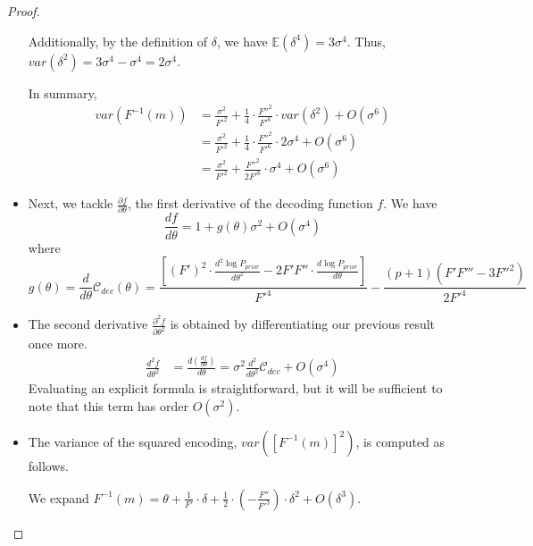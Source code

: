 \begin{proof}
\begin{itemize}
Additionally, by the definition of $\delta$, we have $\mathbb{E}(\delta^4) = 3\sigma^4$.
Thus, $var(\delta^2) = 3\sigma^4 - \sigma^4 = 2\sigma^4$.

In summary,
\begin{align*}
    var(F^{-1}(m)) &= \frac{\sigma^2}{F'^2} + \frac{1}{4} \cdot \frac{F''^2}{F'^6} \cdot var(\delta^2) + O(\sigma^6)\\
    &= \frac{\sigma^2}{F'^2} + \frac{1}{4} \cdot \frac{F''^2}{F'^6} \cdot 2\sigma^4 + O(\sigma^6)\\
    &= \frac{\sigma^2}{F'^2} + \frac{F''^2}{2F'^6} \cdot \sigma^4 + O(\sigma^6)
\end{align*}

    \item Next, we tackle {$\frac{\partial f}{\partial \theta}$}, the first derivative of the decoding function $f$.
We have
\begin{equation}
    \frac{df}{d\theta} = 1 + g(\theta) \sigma^2 + O(\sigma^4)
\end{equation}
where
\begin{equation}\label{eq:derivation-of-g}
    g(\theta) = \frac{d}{d\theta} \mathcal{C}_{dec}(\theta) = \frac{[(F')^2 \cdot \frac{d^2 \log P_{prior}}{d \theta^2} - 2F'F'' \cdot \frac{d \log P_{prior}}{d \theta}]}{F'^4} - \frac{(p+1)(F'F''' - 3F''^2)}{2F'^4}
\end{equation}

    

    \item The second derivative {$\frac{\partial^2 f}{\partial \theta^2}$} is obtained by differentiating our previous result once more.
    \begin{align*}
        \frac{d^2f}{d\theta^2} &= \frac{d (\frac{df}{d\theta})}{d\theta} = \sigma^2 \frac{d^2}{d\theta^2} \mathcal{C}_{dec} + O(\sigma^4)
    \end{align*}
Evaluating an explicit formula is straightforward, but it will be sufficient to note that this term has order $O(\sigma^2)$.

    \item The variance of the squared encoding, {$var([F^{-1}(m)]^2)$}, is computed as follows.


    
    We expand $F^{-1}(m) = \theta + \frac{1}{F'} \cdot \delta + \frac{1}{2} \cdot (-\frac{F''}{F'^3}) \cdot \delta^2 + O(\delta^3)$.


\end{itemize}
\end{proof}
